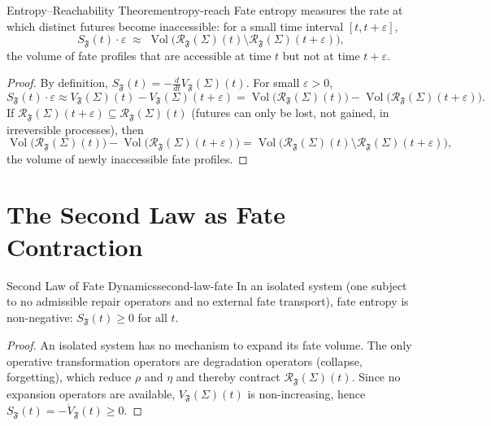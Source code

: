\documentclass[12pt,twoside,openright]{book}
\newcommand{\Vol}{\operatorname{Vol}}     %
\newcommand{\fateMap}{\mathfrak{F}}
\newcommand{\survRatio}{\rho}             %
\newcommand{\repEff}{\eta}               %
\providecommand{\fateReach}[1]{\mathcal{R}_{\fateMap}(#1)}
\providecommand{\fateVol}[1]{V_{\fateMap}(#1)}
\providecommand{\fateEnt}{S_{\fateMap}}
\begin{document}
\begin{theorem}{Entropy--Reachability Theorem}{entropy-reach}
Fate entropy measures the rate at which distinct futures become
inaccessible: for a small time interval $[t,t+\varepsilon]$,
\[
  \fateEnt(t)\cdot\varepsilon
  \;\approx\;
  \Vol\bigl(
    \fateReach{\Sigma}(t)\setminus\fateReach{\Sigma}(t+\varepsilon)
  \bigr),
\]
the volume of fate profiles that are accessible at time $t$
but not at time $t+\varepsilon$.
\begin{proof}
By definition,
$\fateEnt(t)=-\frac{d}{dt}\fateVol{\Sigma}(t)$. For small
$\varepsilon>0$,
\[
  \fateEnt(t)\cdot\varepsilon
  \approx \fateVol{\Sigma}(t)-\fateVol{\Sigma}(t+\varepsilon)
  = \Vol\bigl(\fateReach{\Sigma}(t)\bigr)
   -\Vol\bigl(\fateReach{\Sigma}(t+\varepsilon)\bigr).
\]
If $\fateReach{\Sigma}(t+\varepsilon)\subseteq
\fateReach{\Sigma}(t)$ (futures can only be lost, not gained,
in irreversible processes), then
\[
  \Vol\bigl(\fateReach{\Sigma}(t)\bigr)
  -\Vol\bigl(\fateReach{\Sigma}(t+\varepsilon)\bigr)
  = \Vol\bigl(
    \fateReach{\Sigma}(t)\setminus\fateReach{\Sigma}(t+\varepsilon)
  \bigr),
\]
the volume of newly inaccessible fate profiles.
\end{proof}
\end{theorem}

\section{The Second Law as Fate Contraction}

\begin{theorem}{Second Law of Fate Dynamics}{second-law-fate}
In an isolated system (one subject to no admissible repair
operators and no external fate transport), fate entropy is
non-negative: $\fateEnt(t)\ge 0$ for all $t$.
\begin{proof}
An isolated system has no mechanism to expand its fate volume.
The only operative transformation operators are degradation
operators (collapse, forgetting), which reduce $\survRatio$
and $\repEff$ and thereby contract $\fateReach{\Sigma}(t)$.
Since no expansion operators are available,
$\fateVol{\Sigma}(t)$ is non-increasing, hence
$\fateEnt(t)=-\dot{V}_\fateMap(t)\ge 0$.
\end{proof}
\end{theorem}
\end{document}
